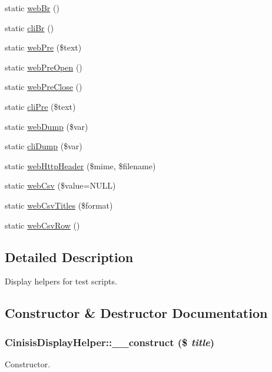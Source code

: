 \begin{DoxyCompactItemize}
static \hyperlink{classCinisisDisplayHelper_a9c8b637e47e4263901baf4c5f2064d8d}{webBr} ()
\item 
static \hyperlink{classCinisisDisplayHelper_ad61db99c9d639678c96879aa34288323}{cliBr} ()
\item 
static \hyperlink{classCinisisDisplayHelper_a528283a8b16090918f1878dca5ee24fb}{webPre} (\$text)
\item 
static \hyperlink{classCinisisDisplayHelper_a9c2a28e3865e8b3950b428770a132aa0}{webPreOpen} ()
\item 
static \hyperlink{classCinisisDisplayHelper_af4d61af3ed8211300032a208175d72ed}{webPreClose} ()
\item 
static \hyperlink{classCinisisDisplayHelper_a50bf73bd3722766cbae1b46b3092453d}{cliPre} (\$text)
\item 
static \hyperlink{classCinisisDisplayHelper_a7811830062abc85b90cf391a9ff89fdf}{webDump} (\$var)
\item 
static \hyperlink{classCinisisDisplayHelper_abd525c7b612f9dce348bb1479470b445}{cliDump} (\$var)
\item 
static \hyperlink{classCinisisDisplayHelper_a6629bfa4b0ccd26d1433ca2302ce8c41}{webHttpHeader} (\$mime, \$filename)
\item 
static \hyperlink{classCinisisDisplayHelper_a0155226dc341e71cf2d32a7611a6402b}{webCsv} (\$value=NULL)
\item 
static \hyperlink{classCinisisDisplayHelper_ae15e846c353078222ee061a835c8c0f8}{webCsvTitles} (\$format)
\item 
static \hyperlink{classCinisisDisplayHelper_aa020ea03001524e4e437069f08ba8e26}{webCsvRow} ()
\end{DoxyCompactItemize}


\subsection{Detailed Description}
Display helpers for test scripts. 

\subsection{Constructor \& Destructor Documentation}
\hypertarget{classCinisisDisplayHelper_ae60a4cc7ad15109c83b3d934f89b283e}{
\subsubsection[{\_\-\_\-construct}]{\setlength{\rightskip}{0pt plus 5cm}CinisisDisplayHelper::\_\-\_\-construct (\$ {\em title})}}
\label{classCinisisDisplayHelper_ae60a4cc7ad15109c83b3d934f89b283e}
Constructor.



